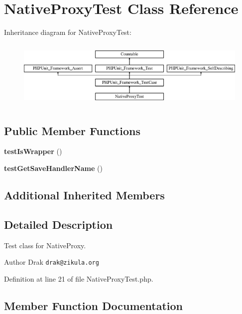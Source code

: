 \section{Native\+Proxy\+Test Class Reference}
\label{class_symfony_1_1_component_1_1_http_foundation_1_1_tests_1_1_session_1_1_storage_1_1_proxy_1_1_native_proxy_test}
Inheritance diagram for Native\+Proxy\+Test\+:\begin{figure}[H]
\begin{center}
\leavevmode
\includegraphics[height=3.303835cm]{class_symfony_1_1_component_1_1_http_foundation_1_1_tests_1_1_session_1_1_storage_1_1_proxy_1_1_native_proxy_test}
\end{center}
\end{figure}
\subsection*{Public Member Functions}
\begin{DoxyCompactItemize}
\item 
{\bf test\+Is\+Wrapper} ()
\item 
{\bf test\+Get\+Save\+Handler\+Name} ()
\end{DoxyCompactItemize}
\subsection*{Additional Inherited Members}


\subsection{Detailed Description}
Test class for Native\+Proxy.

\begin{DoxyAuthor}{Author}
Drak {\tt drak@zikula.\+org} 
\end{DoxyAuthor}


Definition at line 21 of file Native\+Proxy\+Test.\+php.



\subsection{Member Function Documentation}
